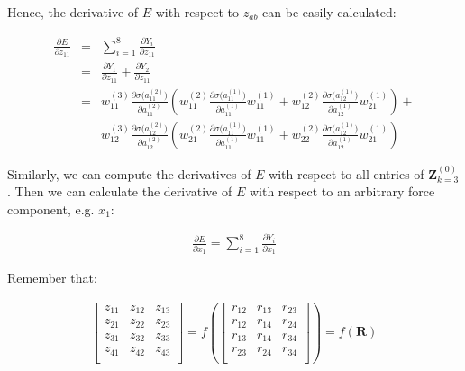 \documentclass{article}
\begin{document}
Hence, the derivative of $E$ with respect to $z_{ab}$ can be easily calculated:

\begin{eqnarray}
\frac{\partial{E}}{\partial{z_{11}}} 
& = &
\sum_{i=1}^8{
	\frac{\partial{Y_i}}{\partial{z_{11}}}
} \nonumber \\
& = &
\frac{\partial{Y_1}}{\partial{z_{11}}} + \frac{\partial{Y_2}}{\partial{z_{11}}} \\
& = & 
w^{(3)}_{11}\frac{\partial{\sigma(a_{11}^{(2)}})}{\partial{a_{11}^{(2)}}} 
\left(
	w_{11}^{(2)}\frac{\partial{\sigma(a_{11}^{(1)}})}{\partial{a_{11}^{(1)}}}w^{(1)}_{11} +
	w_{12}^{(2)}\frac{\partial{\sigma(a_{12}^{(1)}})}{\partial{a_{12}^{(1)}}}w^{(1)}_{21}  
\right) + \nonumber \\
&& 
w^{(3)}_{12}\frac{\partial{\sigma(a_{12}^{(2)}})}{\partial{a_{12}^{(2)}}} 
\left(
	w_{21}^{(2)}\frac{\partial{\sigma(a_{11}^{(1)}})}{\partial{a_{11}^{(1)}}}w^{(1)}_{11} +
	w_{22}^{(2)}\frac{\partial{\sigma(a_{12}^{(1)}})}{\partial{a_{12}^{(1)}}}w^{(1)}_{21}  
\right)
\end{eqnarray} 

\noindent Similarly, we can compute the derivatives of $E$ with respect to all entries of 
$\mathbf{Z}^{(0)}_{k=3}$. Then we can calculate the derivative of $E$ with respect to an 
arbitrary force component, e.g. $x_1$:

\begin{eqnarray}
\frac{\partial{E}}{\partial{x_1}} = \sum_{i=1}^{8}{
	\frac{\partial{Y_{i}}}{\partial{x_1}}
}
\end{eqnarray}

\noindent Remember that:

\begin{eqnarray}
\left[\begin{array}{ccc}
	z_{11} & z_{12}   & z_{13}   \\
	z_{21} & z_{22}   & z_{23}   \\
	z_{31} & z_{32}   & z_{33}   \\
	z_{41} & z_{42}   & z_{43}   \\
\end{array}\right] =
f(\left[\begin{array}{ccc}
	r_{12} & r_{13}   & r_{23}   \\
	r_{12} & r_{14}   & r_{24}   \\
	r_{13} & r_{14}   & r_{34}   \\
	r_{23} & r_{24}   & r_{34}   \\
\end{array}
\right]) = f(\mathbf{R})
\end{eqnarray}
\end{document}

